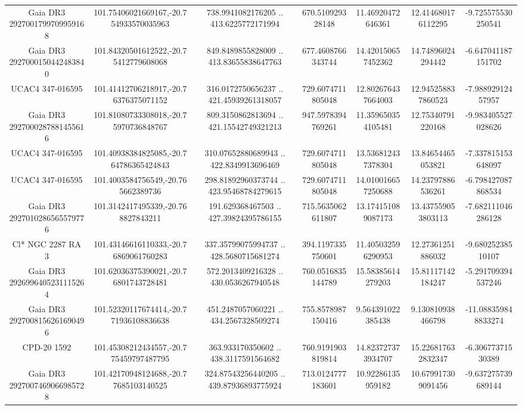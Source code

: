 \begin{table}
\begin{tabular}{ccccccc}
Gaia DR3 2927001799709959168 & 101.75406021669167,-20.754933570035963 & 738.9941082176205 .. 413.6225772171994 & 670.510929328148 & 11.46920472646361 & 12.414680176112295 & -9.725575530250541 \\
Gaia DR3 2927000150442483840 & 101.84320501612522,-20.75412779608068 & 849.8489855828009 .. 413.83655838647763 & 677.4608766343744 & 14.420150657452362 & 14.74896024294442 & -6.647041187151702 \\
UCAC4 347-016595 & 101.41412706218917,-20.76376375071152 & 316.0172750656237 .. 421.45939261318057 & 729.6074711805048 & 12.802676437664003 & 12.945258837860523 & -7.98892912457957 \\
Gaia DR3 2927000287881455616 & 101.81080733308018,-20.75970736848767 & 809.3150862813694 .. 421.15542749321213 & 947.5978394769261 & 11.359650354105481 & 12.75340791220168 & -9.983405527028626 \\
UCAC4 347-016595 & 101.40938384825085,-20.764786365424843 & 310.07652880689943 .. 422.8349913696469 & 729.6074711805048 & 13.536812437378304 & 13.84654465053821 & -7.337815153648097 \\
UCAC4 347-016595 & 101.4003584756549,-20.765662389736 & 298.81892960373744 .. 423.95468784279615 & 729.6074711805048 & 14.010016657250688 & 14.23797886536261 & -6.798427087868534 \\
Gaia DR3 2927010286565579776 & 101.3142417495339,-20.768827843211 & 191.629368467503 .. 427.39824395786155 & 715.5635062611807 & 13.174151089087173 & 13.437559053803113 & -7.682111046286128 \\
Cl* NGC 2287     RA       3 & 101.43146616110333,-20.76869061760283 & 337.35799075994737 .. 428.5680715681274 & 394.1197335750601 & 11.405032596290953 & 12.27361251886032 & -9.68025238510107 \\
Gaia DR3 2926996405231115264 & 101.62036375390021,-20.76801743728481 & 572.2013409216328 .. 430.0536267940548 & 760.0516835144789 & 15.58385614279203 & 15.81117142184247 & -5.291709394537246 \\
Gaia DR3 2927008156261690496 & 101.52320117674414,-20.771936108836638 & 451.2487057060221 .. 434.2567328509274 & 755.8578987150416 & 9.564391022385438 & 9.130810938466798 & -11.088359848833274 \\
CPD-20  1592 & 101.45308212434557,-20.775459797487795 & 363.933170350602 .. 438.3117591564682 & 760.9191903819814 & 14.823727373934707 & 15.226817632832347 & -6.30677371530389 \\
Gaia DR3 2927007469066985728 & 101.42170948124688,-20.77685103140525 & 324.87543256440205 .. 439.87936893775924 & 713.0124777183601 & 10.92286135959182 & 10.679917309091456 & -9.637275739689144 \\

\end{tabular}
\end{table}
